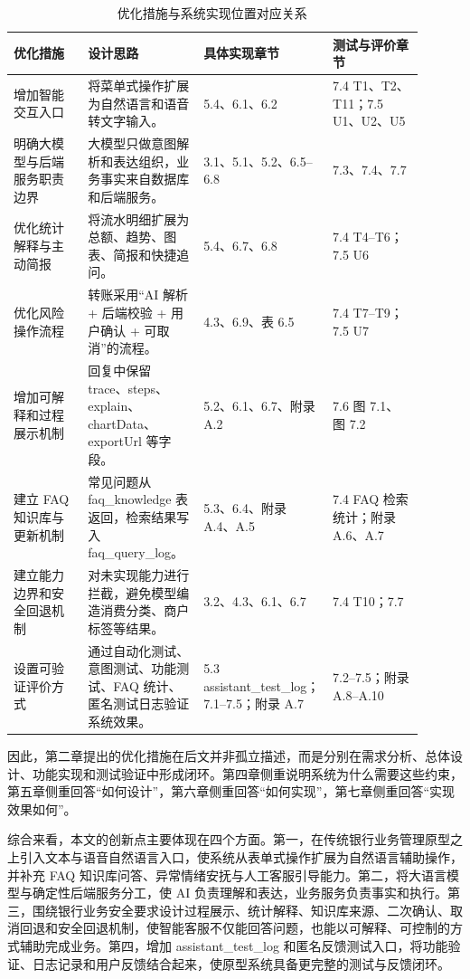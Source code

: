 \documentclass[bachelor, print]{xduthesis}
\begin{document}
\begin{table}[H]
    \centering
    \caption{优化措施与系统实现位置对应关系}
    \label{tab:optimization-implementation-map}
    \scriptsize
    \setlength{\tabcolsep}{2pt}
    \renewcommand{\arraystretch}{1.15}
    \begin{tabular}{|p{0.18\linewidth}|p{0.28\linewidth}|p{0.22\linewidth}|p{0.22\linewidth}|}
        \hline
        优化措施 & 设计思路 & 具体实现章节 & 测试与评价章节 \\
        \hline
        增加智能交互入口 & 将菜单式操作扩展为自然语言和语音转文字输入。 & 5.4、6.1、6.2 & 7.4 T1、T2、T11；7.5 U1、U2、U5 \\
        \hline
        明确大模型与后端服务职责边界 & 大模型只做意图解析和表达组织，业务事实来自数据库和后端服务。 & 3.1、5.1、5.2、6.5--6.8 & 7.3、7.4、7.7 \\
        \hline
        优化统计解释与主动简报 & 将流水明细扩展为总额、趋势、图表、简报和快捷追问。 & 5.4、6.7、6.8 & 7.4 T4--T6；7.5 U6 \\
        \hline
        优化风险操作流程 & 转账采用“AI 解析 + 后端校验 + 用户确认 + 可取消”的流程。 & 4.3、6.9、表 6.5 & 7.4 T7--T9；7.5 U7 \\
        \hline
        增加可解释和过程展示机制 & 回复中保留 trace、steps、explain、chartData、exportUrl 等字段。 & 5.2、6.1、6.7、附录 A.2 & 7.6 图 7.1、图 7.2 \\
        \hline
        建立 FAQ 知识库与更新机制 & 常见问题从 faq\_knowledge 表返回，检索结果写入 faq\_query\_log。 & 5.3、6.4、附录 A.4、A.5 & 7.4 FAQ 检索统计；附录 A.6、A.7 \\
        \hline
        建立能力边界和安全回退机制 & 对未实现能力进行拦截，避免模型编造消费分类、商户标签等结果。 & 3.2、4.3、6.1、6.7 & 7.4 T10；7.7 \\
        \hline
        设置可验证评价方式 & 通过自动化测试、意图测试、功能测试、FAQ 统计、匿名测试日志验证系统效果。 & 5.3 assistant\_test\_log；7.1--7.5；附录 A.7 & 7.2--7.5；附录 A.8--A.10 \\
        \hline
    \end{tabular}
\end{table}

因此，第二章提出的优化措施在后文并非孤立描述，而是分别在需求分析、总体设计、功能实现和测试验证中形成闭环。第四章侧重说明系统为什么需要这些约束，第五章侧重回答“如何设计”，第六章侧重回答“如何实现”，第七章侧重回答“实现效果如何”。

综合来看，本文的创新点主要体现在四个方面。第一，在传统银行业务管理原型之上引入文本与语音自然语言入口，使系统从表单式操作扩展为自然语言辅助操作，并补充 FAQ 知识库问答、异常情绪安抚与人工客服引导能力。第二，将大语言模型与确定性后端服务分工，使 AI 负责理解和表达，业务服务负责事实和执行。第三，围绕银行业务安全要求设计过程展示、统计解释、知识库来源、二次确认、取消回退和安全回退机制，使智能客服不仅能回答问题，也能以可解释、可控制的方式辅助完成业务。第四，增加 assistant\_test\_log 和匿名反馈测试入口，将功能验证、日志记录和用户反馈结合起来，使原型系统具备更完整的测试与反馈闭环。
\end{document}
